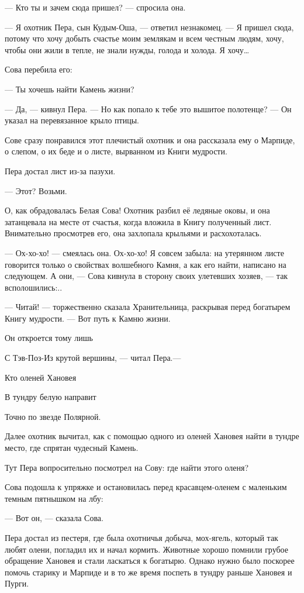 \documentclass[oneside,final,14pt]{extreport}
\begin{document}
	— Кто ты и зачем сюда пришел? — спросила она.
	
	— Я охотник Пера, сын Кудым-Оша, — ответил незнакомец. — Я пришел сюда, потому что хочу добыть счастье моим землякам и всем честным людям, хочу, чтобы они жили в тепле, не знали нужды, голода и холода. Я хочу…
	
	Сова перебила его:
	
	— Ты хочешь найти Камень жизни?
	
	— Да, — кивнул Пера. — Но как попало к тебе это вышитое полотенце? — Он указал на перевязанное крыло птицы.
	
	Сове сразу понравился этот плечистый охотник и она рассказала ему о Марпиде, о слепом, о их беде и о листе, вырванном из Книги мудрости.
	
	Пера достал лист из-за пазухи.
	
	— Этот? Возьми.
	
	О, как обрадовалась Белая Сова! Охотник разбил её ледяные оковы, и она затанцевала на месте от счастья, когда вложила в Книгу полученный лист. Внимательно просмотрев его, она захлопала крыльями и расхохоталась.
	
	— Ох-хо-хо! — смеялась она. Ох-хо-хо! Я совсем забыла: на утерянном листе говорится только о свойствах волшебного Камня, а как его найти, написано на следующем. А они, — Сова кивнула в сторону своих улетевших хозяев, — так всполошились:..
	
	— Читай! — торжественно сказала Хранительница, раскрывая перед богатырем Книгу мудрости. — Вот путь к Камню жизни.
	
\qquad \qquad \qquad 	Он откроется тому лишь
	
\qquad \qquad \qquad 	С Тэв-Поз-Из крутой вершины, — читал Пера.—
	
\qquad \qquad \qquad 	Кто оленей Хановея
	
\qquad \qquad \qquad 	В тундру белую направит
	
\qquad \qquad \qquad 	Точно по звезде Полярной.
	
	Далее охотник вычитал, как с помощью одного из оленей Хановея найти в тундре место, где спрятан чудесный Камень.
	
	Тут Пера вопросительно посмотрел на Сову: где найти этого оленя?
	
	Сова подошла к упряжке и остановилась перед красавцем-оленем с маленьким темным пятнышком на лбу:
	
	— Вот он, — сказала Сова.
	
	Пера достал из пестеря, где была охотничья добыча, мох-ягель, который так любят олени, погладил их и начал кормить. Животные хорошо помнили грубое обращение Хановея и стали ласкаться к богатырю. Однако нужно было поскорее помочь старику и Марпиде и в то же время поспеть в тундру раньше Хановея и Пурги.
	
\end{document}
